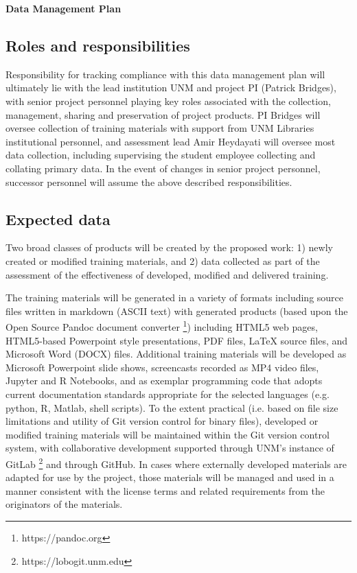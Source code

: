 \documentclass[11pt]{article}
\begin{document}
\begin{center}
{\Large\sc\bf Data Management Plan}
\end{center}

\label{sec:dmp}

\subsection*{Roles and
responsibilities}\label{roles-and-responsibilities}

Responsibility for tracking compliance with this data management plan will ultimately lie with the lead institution UNM and project PI (Patrick Bridges), with senior project personnel playing key roles associated with the collection, management, sharing and preservation of project products. PI Bridges will oversee collection of training materials with support from UNM Libraries institutional personnel, and assessment lead Amir Heydayati will oversee most data collection, including supervising the student employee collecting and collating primary data. In the event of changes in senior project personnel, successor personnel will assume the above described responsibilities.  

\subsection*{Expected data}\label{expected-data}

Two broad classes of products will be created by the proposed work: 1) newly created or modified training materials, and 2) data collected as part of the assessment of the effectiveness of developed, modified and delivered training. 

The training materials will be generated in a variety of formats including source files written in markdown (ASCII text) with generated products (based upon the Open Source Pandoc document converter \footnote{https://pandoc.org}) including HTML5 web pages, HTML5-based Powerpoint style presentations, PDF files, LaTeX source files, and Microsoft Word (DOCX) files. Additional training materials will be developed as Microsoft Powerpoint slide shows, screencasts recorded as MP4 video files, Jupyter and R Notebooks, and as exemplar programming code that adopts current documentation standards appropriate for the selected languages (e.g. python, R, Matlab, shell scripts). To the extent practical (i.e. based on file size limitations and utility of Git version control for binary files), developed or modified training materials will be maintained within the Git version control system, with collaborative development supported through UNM's instance of GitLab \footnote{https://lobogit.unm.edu} and through GitHub. In cases where externally developed materials are adapted for use by the project, those materials will be managed and used in a manner consistent with the license terms and related requirements from the originators of the materials. 
\end{document}
